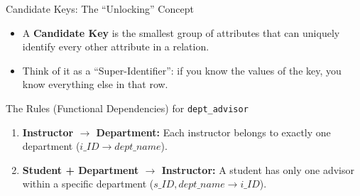 \documentclass[aspectratio=169]{beamer}
\begin{document}
\begin{frame}{Candidate Keys: The ``Unlocking'' Concept}
    \begin{itemize}
        \item A \textbf{Candidate Key} is the smallest group of attributes that can uniquely identify every other attribute in a relation.
        \item Think of it as a ``Super-Identifier'': if you know the values of the key, you know everything else in that row.
    \end{itemize}

    \begin{block}{The Rules (Functional Dependencies) for \texttt{dept\_advisor}}
        \begin{enumerate}
            \item \textbf{Instructor $\rightarrow$ Department:} Each instructor belongs to exactly one department ($i\_ID \rightarrow dept\_name$).
            \item \textbf{Student + Department $\rightarrow$ Instructor:} A student has only one advisor within a specific department ($s\_ID, dept\_name \rightarrow i\_ID$).
        \end{enumerate}
    \end{block}
\end{frame}
\end{document}
